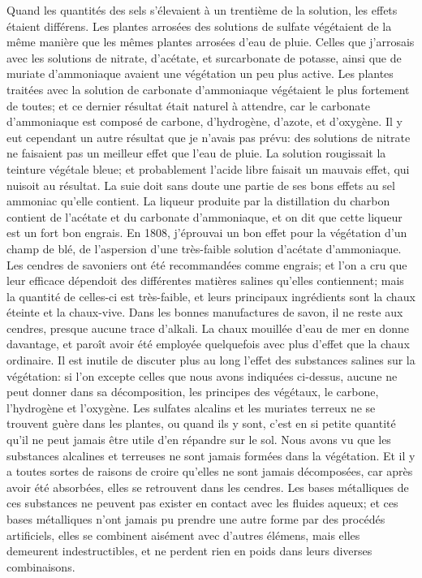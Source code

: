 Quand les quantités des sels s'élevaient à un trentième de la solution, les effets étaient différens. Les plantes arrosées des solutions de sulfate végétaient de la même manière que les mêmes plantes arrosées d'eau de pluie. Celles que j'arrosais avec les solutions de nitrate, d'acétate, et surcarbonate de potasse, ainsi que de muriate d'ammoniaque avaient une végétation un peu plus active. Les plantes traitées avec la solution de carbonate d'ammoniaque végétaient le plus fortement de toutes; et ce dernier résultat était naturel à attendre, car le carbonate d'ammoniaque est composé de carbone, d'hydrogène, d'azote, et d'oxygène. Il y eut cependant un autre résultat que je n'avais pas prévu: des solutions de nitrate ne faisaient pas un meilleur effet que l'eau de pluie. La solution rougissait la teinture végétale bleue; et probablement l'acide libre faisait un mauvais effet, qui nuisoit au résultat.
\setcounter{page}{247} La suie doit sans doute une partie de ses bons effets au sel ammoniac qu'elle contient. La liqueur produite par la distillation du charbon contient de l'acétate et du carbonate d'ammoniaque, et on dit que cette liqueur est un fort bon engrais.
En 1808, j'éprouvai un bon effet pour la végétation d'un champ de blé, de l'aspersion d'une très-faible solution d'acétate d'ammoniaque.
Les cendres de savoniers ont été recommandées comme engrais; et l'on a cru que leur efficace dépendoit des différentes matières salines qu'elles contiennent; mais la quantité de celles-ci est très-faible, et leurs principaux ingrédients sont la chaux éteinte et la chaux-vive. Dans les bonnes manufactures de savon, il ne reste aux cendres, presque aucune trace d'alkali. La chaux mouillée d'eau de mer en donne davantage, et paroît avoir été employée quelquefois avec plus d'effet que la chaux ordinaire.
Il est inutile de discuter plus au long l'effet des substances salines sur la végétation: si l'on excepte celles que nous avons indiquées ci-dessus, aucune ne peut donner dans sa décomposition, les principes des végétaux, le carbone, l'hydrogène et l'oxygène.
\setcounter{page}{248} Les sulfates alcalins et les muriates terreux ne se trouvent guère dans les plantes, ou quand ils y sont, c’est en si petite quantité qu’il ne peut jamais être utile d’en répandre sur le sol. Nous avons vu que les substances alcalines et terreuses ne sont jamais formées dans la végétation. Et il y a toutes sortes de raisons de croire qu’elles ne sont jamais décomposées, car après avoir été absorbées, elles se retrouvent dans les cendres.
Les bases métalliques de ces substances ne peuvent pas exister en contact avec les fluides aqueux; et ces bases métalliques n’ont jamais pu prendre une autre forme par des procédés artificiels, elles se combinent aisément avec d’autres élémens, mais elles demeurent indestructibles, et ne perdent rien en poids dans leurs diverses combinaisons.